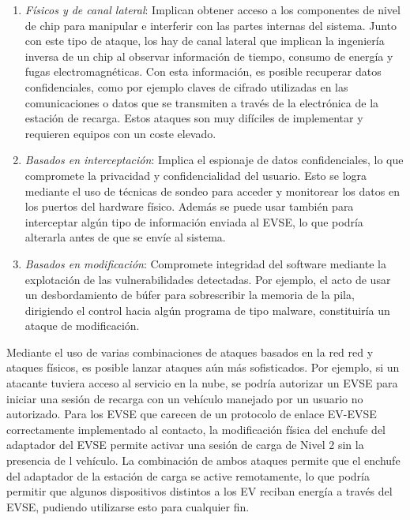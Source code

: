 \documentclass[12pt,a4paper,onecolumn,oneside]{report}
\newcounter{subsubsubsection}[subsubsection]
\begin{document}
\begin{enumerate}

\item \textit{Físicos y de canal lateral}: Implican obtener acceso a los componentes de nivel de chip para manipular e interferir con las partes internas del sistema. Junto con este tipo de ataque, los hay de canal lateral que implican la ingeniería inversa de un chip al observar información de tiempo, consumo de energía y fugas electromagnéticas. Con esta información, es posible recuperar datos confidenciales, como por ejemplo claves de cifrado utilizadas en las comunicaciones o datos que se transmiten a través de la electrónica de la estación de recarga. Estos ataques son muy difíciles de implementar y requieren equipos con un coste elevado.

\item \textit{Basados en interceptación}: Implica el espionaje de datos confidenciales, lo que compromete la privacidad y confidencialidad del usuario. Esto se logra mediante el uso de técnicas de sondeo para acceder y monitorear los datos en los puertos del hardware físico. Además se puede usar también para interceptar algún tipo de información enviada al EVSE, lo que podría alterarla antes de que se envíe al sistema.

\item \textit{Basados en modificación}: Compromete integridad del software mediante la explotación de las vulnerabilidades detectadas. Por ejemplo, el acto de usar un desbordamiento de búfer para sobrescribir la memoria de la pila, dirigiendo el control hacia algún programa de tipo malware, constituiría un ataque de modificación.

\end{enumerate}




Mediante el uso de varias combinaciones de ataques basados en la red red y ataques físicos, es posible lanzar ataques aún más sofisticados. Por ejemplo, si un atacante tuviera acceso al servicio en la nube, se podría autorizar un EVSE para iniciar una sesión de recarga con un vehículo manejado por un usuario no autorizado. Para los EVSE que carecen de un protocolo de enlace EV-EVSE correctamente implementado al contacto, la modificación física del enchufe del adaptador del EVSE permite activar una sesión de carga de Nivel 2 sin la presencia de l vehículo. La combinación de ambos ataques permite que el enchufe del adaptador de la estación de carga se active remotamente, lo que podría permitir que algunos dispositivos distintos a los EV reciban energía a través del EVSE, pudiendo utilizarse esto para cualquier fin.
\end{document}
